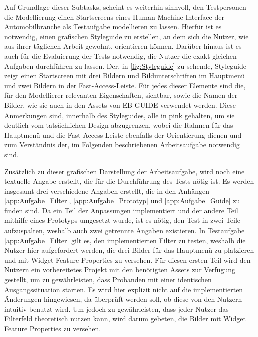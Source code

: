 Auf Grundlage dieser Subtasks, scheint es weiterhin sinnvoll, den Testpersonen die Modellierung einen Startscreens eines Human Machine Interface der Automobilbranche als Testaufgabe modellieren zu lassen.
Hierfür ist es notwendig, einen grafischen Styleguide zu erstellen, an dem sich die Nutzer, wie aus ihrer täglichen Arbeit gewohnt, orientieren können.
Darüber hinaus ist es auch für die Evaluierung der Tests notwendig, die Nutzer die exakt gleichen Aufgaben durchführen zu lassen.
Der, in \cref{fig:Styleguide} zu sehende, Styleguide zeigt einen Startscreen mit drei Bildern und Bildunterschriften im Hauptmenü und zwei Bildern in der Fast-Access-Leiste.
Für jedes dieser Elemente sind die, für den Modellierer relevanten Eigenschaften, sichtbar, sowie die Namen der Bilder, wie sie auch in den Assets von EB GUIDE verwendet werden.
Diese Anmerkungen sind, innerhalb des Styleguides, alle in pink gehalten, um sie deutlich vom tatsächlichen Design abzugrenzen, wobei die Rahmen für das Hauptmenü und die Fast-Access Leiste ebenfalls der Orientierung dienen und zum Verständnis der, im Folgenden beschriebenen Arbeitsaufgabe notwendig sind.

Zusätzlich zu dieser grafischen Darstellung der Arbeitsaufgabe, wird noch eine textuelle Angabe erstellt, die für die Durchführung des Tests nötig ist.
Es werden insgesamt drei verschiedene Angaben erstellt, die in den Anhängen \ref{app:Aufgabe_Filter}, \ref{app:Aufgabe_Prototyp} und \ref{app:Aufgabe_Guide} zu finden sind.
Da ein Teil der Anpassungen implementiert und der andere Teil mithilfe eines Prototyps umgesetzt wurde, ist es nötig, den Test in zwei Teile aufzuspalten, weshalb auch zwei getrennte Angaben existieren.
In Testaufgabe \ref{app:Aufgabe_Filter} gilt es, den implementierten Filter zu testen, weshalb die Nutzer hier aufgefordert werden, die drei Bilder für das Hauptmenü zu platzieren und mit Widget Feature Properties zu versehen.
Für diesen ersten Teil wird den Nutzern ein vorbereitetes Projekt mit den benötigten Assets zur Verfügung gestellt, um zu gewährleisten, dass Probanden mit einer identischen Ausgangssituation starten.
Es wird hier explizit nicht auf die implementierten Änderungen hingewiesen, da überprüft werden soll, ob diese von den Nutzern intuitiv benutzt wird.
Um jedoch zu gewährleisten, dass jeder Nutzer das Filterfeld theoretisch nutzen kann, wird darum gebeten, die Bilder mit Widget Feature Properties zu versehen.

